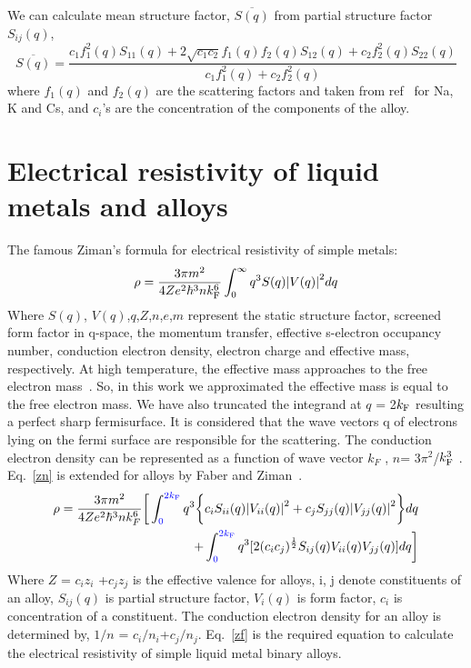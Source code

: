 \documentclass[final12pt]{elsarticle}
\newcommand{\be}{\begin{equation}}
\newcommand{\ee}{\end{equation}}
\newcommand{\bea}{\begin{eqnarray}}
\newcommand{\eea}{\end{eqnarray}}
\begin{document}
We can calculate mean structure factor, $\overline{S(q)}$ from partial structure factor $S_{ij}(q)$,
\be
\overline{S(q)}=\frac{c_1f_{1}^2(q)S_{11}(q)+2\sqrt{c_1 c_2}f_{1}(q)f_{2}(q)S_{12}(q)+c_2f_{2}^2(q)S_{22}(q)}{c_1f_{1}^2(q)+c_2f_{2}^2(q)}
\ee
where $f_{1}(q)$ and $f_{2}(q)$ are the scattering factors and taken from ref~\cite{Doyle1968} for Na, K and Cs, and $c_i$'s are the concentration of the components of the alloy.

\section{Electrical resistivity of liquid metals and alloys}
The famous Ziman's formula for electrical resistivity of simple metals:
\be
\label{zn}
\rho=\frac{3\pi m^2}{4Ze^2\hbar^3 n k^6_{\rm F}} \int_{0}^{\infty} q^3S(q){\lvert{V(q)}\rvert}^{2} dq
\ee
Where $S(q)$, $V(q)$,$q$,$Z$,$n$,$e$,$m$ represent the static structure factor, screened form factor in q-space, the momentum transfer, effective s-electron occupancy number, conduction electron density, electron charge and effective mass, respectively. At high temperature, the effective mass approaches to the free electron mass~\cite{Baym1964}. So, in this work we approximated the effective mass is equal to the free electron mass. We have also truncated the integrand at $q$ = 2$k_{\rm F}$ resulting a perfect sharp fermisurface. It is considered that the wave vectors q of electrons lying on the fermi surface are responsible for the scattering. The conduction electron density can be represented as a function of wave vector $k_F$ , $n$= 3$\pi^2$/$k_{\rm F}^3$ . Eq.~\ref{zn} is extended for alloys by Faber and Ziman~\cite{Faberziman1965}.
\bea
\label{zf}
\rho=\frac{3\pi m^2}{4Ze^2\hbar^3 n k^6_{F}}\bigg [\int_{0}^{\color{blue}{2k_{\rm F}}}q^3\bigg\{c_{i}S_{ii}(q){\lvert{V_{ii}(q)}\rvert}^{2}%
 + c_{j}S_{jj}(q){\lvert{V_{jj}(q)}\rvert}^{2}\bigg\} dq \nonumber\\
 + \int_{0}^{\color{blue}{2k_{\rm F}}} q^3[2 (c_{i}c_{j})^\frac{1}{2}S_{ij}(q)V_{ii}(q)V_{jj}(q)] dq \bigg]
\eea
Where $Z$ = $c_iz_i$ +$c_jz_j$ is the effective valence for alloys, i, j denote constituents of an alloy, $S_{ij}(q)$ is partial structure factor, $V_i(q)$ is form factor, $c_i$ is concentration of a constituent. The conduction electron density for an alloy is determined by, $1/n$ = $c_i/n_i$+$c_j/n_j$. Eq.~\ref{zf} is the required equation to calculate the electrical resistivity of simple liquid metal binary alloys.
\end{document}
